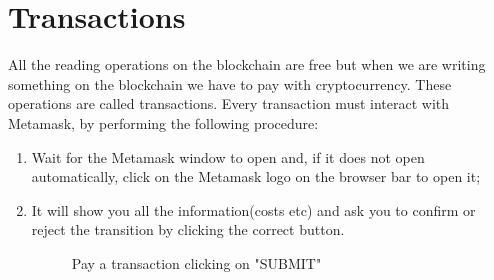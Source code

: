 \documentclass[ManualeUtente]{subfiles}
\begin{document}
\section{Transactions}
All the reading operations on the blockchain are free but when we are writing something on the blockchain we have to pay with cryptocurrency. These operations are called transactions.  
Every transaction must interact with Metamask, by performing the following procedure:
\begin{enumerate}
	\item Wait for the Metamask window to open and, if it does not open automatically, click on the Metamask logo on the browser bar to open it;
	\item It will show you all the information(costs etc) and ask you to confirm or reject the transition by clicking the correct button.
	\begin{figure}[H]
		\centering
		\caption{Pay a transaction clicking on "SUBMIT"}
		\label{fig:Pay a transaction clicking on "SUBMIT"}
	\end{figure}
\end{enumerate}

\newpage
\end{document}
